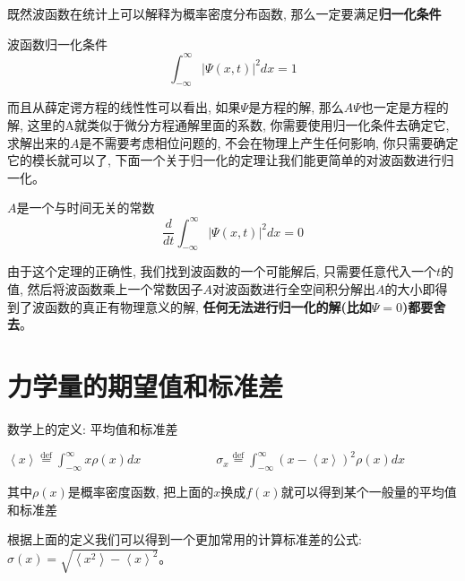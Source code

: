 \documentclass[a4paper,zihao=-4,linespread=1]{ctexrep}
\newenvironment{lequation}{\large\begin{equation}}{\end{equation}}
\begin{document}
    既然波函数在统计上可以解释为概率密度分布函数, 那么一定要满足\textbf{归一化条件}
    \begin{proposition}{波函数归一化条件}
        \begin{lequation}\label{normalized}
            \int_{-\infty}^{\infty}\left|\Psi\left(x,t\right)\right|^{2}dx=1
        \end{lequation}
    \end{proposition}
    而且从薛定谔方程的线性性可以看出, 如果$\Psi$是方程的解, 那么$A\Psi$也一定是方程的解, 这里的A就类似于微分方程通解里面的系数, 你需要使用归一化条件去确定它, 求解出来的$A$是不需要考虑相位问题的, 不会在物理上产生任何影响, 你只需要确定
    它的模长就可以了, 下面一个关于归一化的定理让我们能更简单的对波函数进行归一化。
    \begin{theorem}{$A$是一个与时间无关的常数}
        \begin{lequation}
            \label{normalized-independent-time}
            \frac{d}{dt}\int_{-\infty}^{\infty}\left|\Psi\left(x,t\right)\right|^{2}dx=0
        \end{lequation}
    \end{theorem}
    由于这个定理的正确性, 我们找到波函数的一个可能解后, 只需要任意代入一个$t$的值, 然后将波函数乘上一个常数因子$A$对波函数进行全空间积分解出$A$的大小即得到了波函数的真正有物理意义的解, \textbf{任何无法进行归一化的解(比如$\Psi=0$)都要舍去}。
    \section{力学量的期望值和标准差}
    \begin{define}{数学上的定义: 平均值和标准差}
        \begin{center}
        \begin{math}
            \displaystyle
            \left \langle x \right \rangle \overset{\text{def}}{=}\int_{-\infty}^{\infty}x\rho(x)dx \qquad\qquad\qquad
            \sigma _{x}\overset{\text{def}}{=}\int_{-\infty }^{\infty } (x-\left \langle x \right \rangle )^2\rho(x)dx
        \end{math}
        \end{center}
        其中$\rho(x)$是概率密度函数, 把上面的$x$换成$f(x)$就可以得到某个一般量的平均值和标准差
    \end{define}
    根据上面的定义我们可以得到一个更加常用的计算标准差的公式: $\sigma(x)=\sqrt{\left \langle x^2 \right \rangle-\left \langle x \right \rangle^2}$。
    
\end{document}
